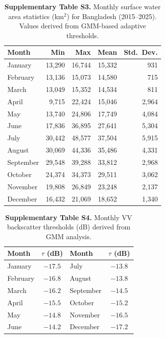 \documentclass[10pt]{article}
\begin{document}
\begin{table}[H]
\centering
\caption{\textbf{Supplementary Table S3.} Monthly surface water area statistics (km$^{2}$) for Bangladesh (2015--2025). Values derived from GMM-based adaptive thresholds.}
\label{tab:s_monthly_water}
\begin{tabular}{lrrrr}
\toprule
\textbf{Month} & \textbf{Min} & \textbf{Max} & \textbf{Mean} & \textbf{Std.\ Dev.} \\
\midrule
January   & 13,290 & 16,744 & 15,332 & 931 \\
February  & 13,136 & 15,073 & 14,580 & 715 \\
March     & 13,049 & 15,352 & 14,534 & 811 \\
April     & 9,715  & 22,424 & 15,046 & 2,964 \\
May       & 13,740 & 24,806 & 17,749 & 4,084 \\
June      & 17,836 & 36,895 & 27,641 & 5,304 \\
July      & 30,442 & 48,577 & 37,504 & 5,915 \\
August    & 30,069 & 44,336 & 35,486 & 4,331 \\
September & 29,548 & 39,288 & 33,812 & 2,968 \\
October   & 24,374 & 34,373 & 29,511 & 3,062 \\
November  & 19,808 & 26,849 & 23,248 & 2,137 \\
December  & 16,432 & 21,069 & 18,652 & 1,340 \\
\bottomrule
\end{tabular}
\end{table}



\begin{table}[H]
\centering
\caption{\textbf{Supplementary Table S4.} Monthly VV backscatter thresholds (dB) derived from GMM analysis.}
\begin{tabular}{lclc}
\toprule
\textbf{Month} & \textbf{$\tau$ (dB)} & \textbf{Month} & \textbf{$\tau$ (dB)} \\
\midrule
January   & $-17.5$ & July      & $-13.8$ \\
February  & $-16.8$ & August    & $-13.8$ \\
March     & $-16.2$ & September & $-14.5$ \\
April     & $-15.5$ & October   & $-15.2$ \\
May       & $-14.8$ & November  & $-16.5$ \\
June      & $-14.2$ & December  & $-17.2$ \\
\bottomrule
\end{tabular}
\end{table}
\end{document}
